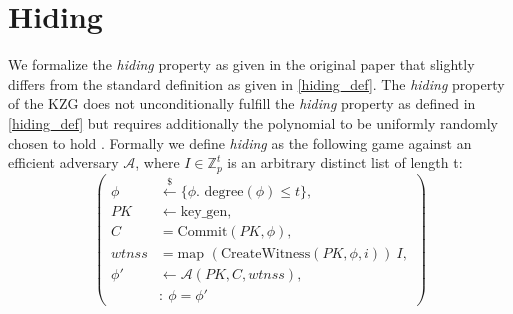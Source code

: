 \section{Hiding}
\label{security:hiding}
We formalize the \textit{hiding} property as given in the original paper \parencite{KZG} that slightly differs from the standard definition as given in \ref{hiding_def}. 
The \textit{hiding} property of the KZG does not unconditionally fulfill the \textit{hiding} property as defined in \ref{hiding_def} but requires additionally the polynomial to be uniformly randomly chosen to hold \parencite{KZG}. Formally we define \textit{hiding} as the following game against an efficient adversary $\mathcal{A}$, where $I\in\mathbb{Z}_p^t$ is an arbitrary distinct list of length t:
\begin{equation*}
    \left(
        \begin{aligned}
            \phi & \overset{{\scriptscriptstyle\$}}{\leftarrow} \{\phi. \text{ degree}(\phi)\le t\},\\
            PK & \leftarrow \text{key\_gen}, \\
            C & = \text{Commit}(PK,\phi), \\
            wtnss &= \text{map } (\text{CreateWitness}(PK,\phi,i))\ I,\\
            \phi' & \leftarrow \mathcal{A}(PK,C,wtnss), \\
            & : \ \phi = \phi'
        \end{aligned}
    \right)
\end{equation*}

